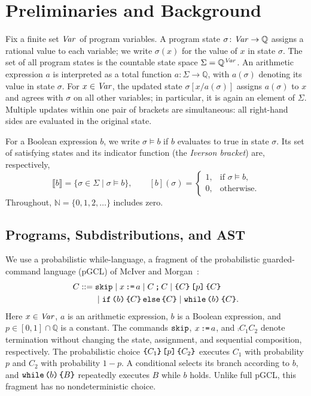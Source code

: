\section{Preliminaries and Background}
\label{sec:prelims}

Fix a finite set $\mathit{Var}$ of program variables.
A program state $\sigma \colon \mathit{Var} \to \mathbb{Q}$ assigns
a rational value to each variable; we write $\sigma(x)$ for the
value of $x$ in state $\sigma$.
The set of all program states is the countable state space
$\Sigma = \mathbb{Q}^{\mathit{Var}}$.
An arithmetic expression $a$ is interpreted as a total function
$a \colon \Sigma \to \mathbb{Q}$, with $a(\sigma)$ denoting its
value in state $\sigma$.
For $x \in \mathit{Var}$, the updated state $\sigma[x/a(\sigma)]$
assigns $a(\sigma)$ to $x$ and agrees with $\sigma$ on all other
variables; in particular, it is again an element of $\Sigma$.
Multiple updates within one pair of brackets are simultaneous:
all right-hand sides are evaluated in the original state.

For a Boolean expression $b$, we write $\sigma \models b$ if $b$
evaluates to true in state $\sigma$.
Its set of satisfying states and its indicator function
(the \emph{Iverson bracket}) are, respectively,
\[
  \llbracket b \rrbracket
  = \{ \sigma \in \Sigma \mid \sigma \models b \},
  \qquad
  [b](\sigma)
  =
  \begin{cases}
    1, & \text{if } \sigma \models b,\\
    0, & \text{otherwise}.
  \end{cases}
\]
Throughout, $\mathbb{N} = \{0,1,2,\ldots\}$ includes zero.

\subsection{Programs, Subdistributions, and AST}

We use a probabilistic while-language, a fragment of the probabilistic
guarded-command language (pGCL) of McIver and
Morgan~\cite{DBLP:series/mcs/McIverM05}:
\[
 \begin{aligned}
 C &::= \ski\mid\ass{x}{a}\mid\comp{C}{C}\mid\pchoice{C}{p}{C}\\
   &\phantom{{}::={}}\mid\ifelse{b}{C}{C}\mid\while{b}{C}.
 \end{aligned}
\]
Here $x\in\mathit{Var}$, $a$ is an arithmetic expression, $b$ is a Boolean
expression, and $p\in[0,1]\cap\mathbb Q$ is a constant.
The commands $\textnormal{\texttt{skip}}$, $x\,\textnormal{\texttt{:=}}\, a$, and $\comp{C_1}{C_2}$ denote
termination without changing the state, assignment, and sequential
composition, respectively. The probabilistic choice
$\textnormal{\texttt{\{}} C_1\textnormal{\texttt{\}}} \, \textnormal{\texttt{[}} p\textnormal{\texttt{]}} \, \textnormal{\texttt{\{}} C_2\textnormal{\texttt{\}}}$ executes $C_1$ with probability $p$ and $C_2$
with probability $1-p$. A conditional selects its branch according to
$b$, and $\textnormal{\texttt{while}}\,\textnormal{\texttt{(}} b\textnormal{\texttt{)}}\,\textnormal{\texttt{\{}} B\textnormal{\texttt{\}}}$ repeatedly executes $B$ while $b$ holds.
Unlike full pGCL, this fragment has no nondeterministic choice.

